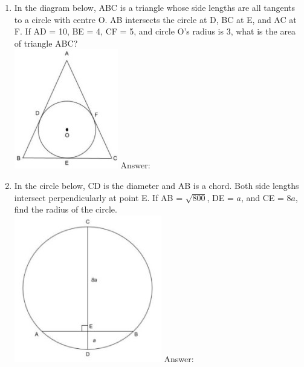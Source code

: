 \documentclass[12pt]{extarticle}
\begin{document}
\begin{enumerate}
    \item {In the diagram below, ABC is a triangle whose side lengths are all tangents to a circle with centre O. AB intersects the circle at D, BC at E, and AC at F. If AD = 10, BE = 4, CF = 5, and circle O's radius is 3, what is the area of triangle ABC?\\
    \includegraphics{April_18_Q4} Answer: }
    \item {In the circle below, CD is the diameter and AB is a chord. Both side lengths intersect perpendicularly at point E. If AB = $\sqrt{800}$, DE = {$a$}, and CE = {$8a$}, find the radius of the circle.\\
    \includegraphics{April_18_Q5} Answer: }
\end{enumerate}
\end{document}

